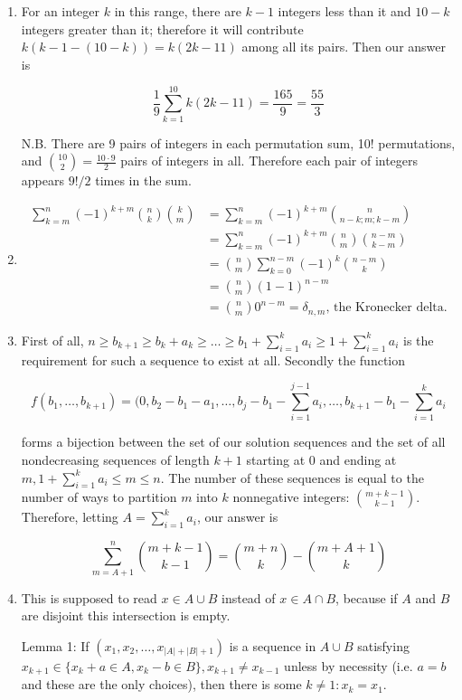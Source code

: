 \documentclass{book}
\numberwithin{equation}{section}
\begin{document}
\begin{enumerate}[label={9.\arabic*}]
\item
For an integer $k$ in this range, there are $k-1$ integers less than it and $10-k$ integers greater than it; therefore
it will contribute $k(k-1-(10-k)) = k(2k-11)$ among all its pairs. Then our answer is

$$\frac{1}{9}\sum_{k=1}^{10}k(2k-11) = \frac{165}{9} = \frac{55}{3}$$

N.B. There are 9 pairs of integers in each permutation sum, 10! permutations, and ${10 \choose 2} = \frac{10 \cdot 9}{2}$
pairs of integers in all. Therefore each pair of integers appears $9!/2$ times in the sum.

\item
\begin{align*}
\sum_{k=m}^n (-1)^{k+m}{n \choose k}{k \choose m} & = \sum_{k=m}^n (-1)^{k+m}{n \choose n-k; m; k-m} \\
& = \sum_{k=m}^n (-1)^{k+m}{n \choose m}{n-m \choose k-m} \\
& = {n \choose m}\sum_{k=0}^{n-m}(-1)^k{n-m \choose k} \\
& = {n \choose m}(1-1)^{n-m} \\
& = {n \choose m}0^{n-m} = \delta_{n,m} \text{, the Kronecker delta.}
\end{align*}

\item
First of all, $n \geq b_{k+1} \geq b_k + a_k \geq \ldots \geq b_1 + \sum_{i=1}^k a_i \geq 1 + \sum_{i=1}^k a_i$
is the requirement for such a sequence to exist at all. Secondly the function

$$f(b_1, \ldots, b_{k+1}) = (0, b_2 - b_1 - a_1, \ldots, b_j - b_1 - \sum_{i=1}^{j-1}a_i, \ldots, b_{k+1} - b_1 - \sum_{i=1}^k a_i$$

forms a bijection between the set of our solution sequences and the set of all nondecreasing sequences of length $k+1$
starting at 0 and ending at $m, 1 + \sum_{i=1}^k a_i \leq m \leq n$. The number of these sequences is equal to the number
of ways to partition $m$ into $k$ nonnegative integers: ${m + k - 1 \choose k-1}$. Therefore, letting $A = \sum_{i=1}^k a_i$,
our answer is

$$\sum_{m=A + 1}^n {m + k - 1 \choose k-1} = {m + n \choose k} - {m + A + 1 \choose k}$$

\item
This is supposed to read $x \in A \cup B$ instead of $x \in A \cap B$, because if $A$ and $B$ are disjoint this
intersection is empty.

Lemma 1: If $(x_1, x_2, \ldots, x_{|A| + |B| + 1})$ is a sequence in $A \cup B$ satisfying
$x_{k+1} \in \{x_k + a \in A, x_k - b \in B\}, x_{k + 1} \neq x_{k-1}$ unless by necessity (i.e. $a=b$ and these are the
only choices), then there is some $k \neq 1 : x_k = x_1$.


\end{enumerate}
\end{document}
